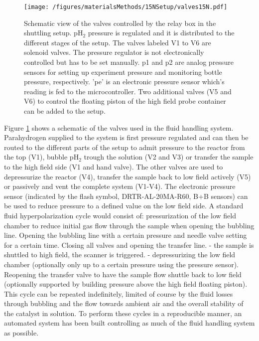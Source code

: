             \begin{figure}
                \texttt{[image: /figures/materialsMethods/15NSetup/valves15N.pdf]}
                \caption[Valve assembly shuttling system]{Schematic view of the valves controlled by the relay box in the shuttling setup. pH$_2$ pressure is regulated and it is distributed to the different stages of the setup. The valves labeled V1 to V6 are solenoid valves. The pressure regulator is not electronically controlled but has to be set manually. p1 and p2 are analog pressure sensors for setting up experiment pressure and monitoring bottle pressure, respectively. 'pe' is an electronic pressure sensor which's reading is fed to the microcontroller. Two additional valves (V5 and V6) to control the floating piston of the high field probe container can be added to the setup.}
                \label{fig:materialsMethods:valveSetup}
            \end{figure}
            Figure \ref{fig:materialsMethods:valveSetup} shows a schematic of the valves used in the fluid handling system. Parahydrogen supplied to the system is first pressure regulated and can then be routed to the different parts of the setup to admit pressure to the reactor from the top (V1), bubble pH$_2$ trough the solution (V2 and V3) or transfer the sample to the high field side (V1 and hand valve). The other valves are used to depressurize the reactor (V4), transfer the sample back to low field actively (V5) or passively  and vent the complete system (V1-V4). The electronic pressure sensor (indicated by the flash symbol, DRTR-AL-20MA-R60, B+B sensors) can be used to reduce pressure to a defined value on the low field side.
            A standard fluid hyperpolarization cycle would consist of: pressurization of the low field chamber to reduce initial gas flow through the sample when opening the bubbling line.  Opening the bubbling line with a certain pressure and needle valve setting for a certain time.  Closing all valves and opening the transfer line. - the sample is shuttled to high field, the scanner is triggered. - depressurizing the low field chamber (optionally only up to a certain pressure using the pressure sensor).  Reopening the transfer valve to have the sample flow shuttle back to low field (optionally supported by building pressure above the high field floating piston).
            This cycle can be repeated indefinitely, limited of course by the fluid losses through bubbling and the flow towards ambient air and the overall stability of the catalyst in solution. 
            To perform these cycles in a reproducible manner, an automated system has been built controlling as much of the fluid handling system as possible.
